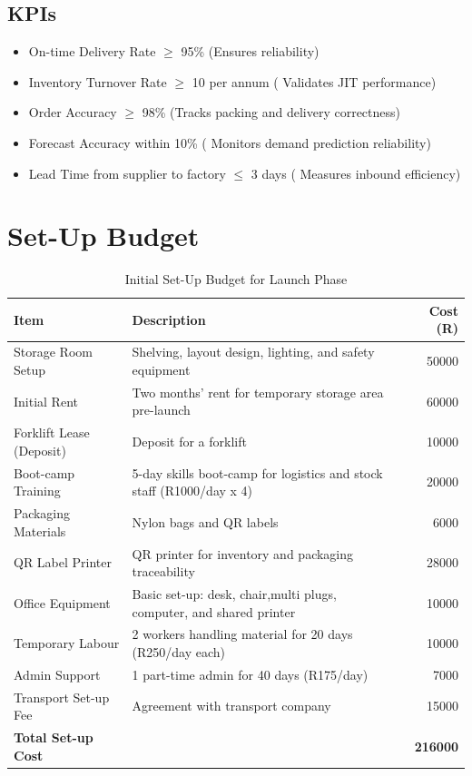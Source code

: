 \subsection{KPIs}

\begin{itemize}[noitemsep]
  \item On-time Delivery Rate $\geq$ 95\% (Ensures reliability)
  \item Inventory Turnover Rate $\geq$ 10 per annum ( Validates JIT performance)
  \item Order Accuracy $\geq$ 98\% (Tracks packing and delivery correctness)
  \item Forecast Accuracy within 10\% ( Monitors demand prediction reliability)
  \item Lead Time from supplier to factory $\leq$ 3 days ( Measures inbound efficiency)
\end{itemize}

\section{Set-Up Budget}

\begin{table}[H]
\centering
\caption{Initial Set-Up Budget for Launch Phase}
\renewcommand{\arraystretch}{1.4}
\begin{tabular}{|p{5cm}|p{7cm}|r|}
\hline
\textbf{Item} & \textbf{Description} & \textbf{Cost (R)} \\
\hline
Storage Room Setup & Shelving, layout design, lighting, and safety equipment & 50000 \\
Initial Rent & Two months' rent for temporary storage area pre-launch & 60000 \\
Forklift Lease (Deposit) & Deposit for a forklift  & 10000 \\
Boot-camp Training & 5-day skills boot-camp for logistics and stock staff (R1000/day x 4) & 20000 \\
Packaging Materials & Nylon bags and QR labels& 6000 \\
QR Label Printer & QR printer for inventory and packaging traceability & 28000 \\
Office Equipment & Basic set-up: desk, chair,multi plugs, computer, and shared printer & 10000 \\
Temporary Labour & 2 workers handling material for 20 days (R250/day each) & 10000 \\
Admin Support & 1 part-time admin for 40 days (R175/day) & 7000 \\
Transport Set-up Fee &  Agreement with transport company  & 15000 \\
\hline
\textbf{Total Set-up Cost} & & \textbf{216000} \\
\hline
\end{tabular}
\end{table}

